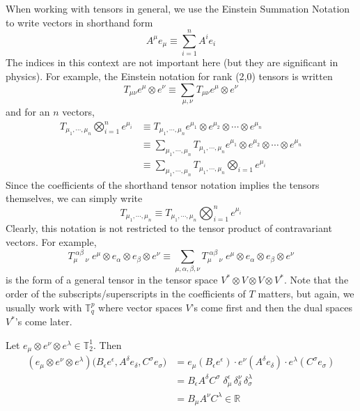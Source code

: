   When working with tensors in general, we use the Einstein Summation Notation to write vectors in shorthand form
  \[ A^{\mu} e_{\mu} \equiv \sum_{i=1}^{n} A^{i} e_{i}\]
  The indices in this context are not important here (but they are significant in physics). For example, the Einstein notation for rank (2,0) tensors is written
  \[ T_{\mu \nu} e^{\mu} \otimes e^{\nu} \equiv \sum_{\mu, \nu} T_{\mu \nu} e^{\mu} \otimes e^{\nu}\]
  and for an $n$ vectors, 
  \begin{align*}
    T_{\mu_{1}, \cdots, \mu_{n}} \bigotimes_{i=1}^{n} e^{\mu_{i}} & \equiv T_{\mu_{1}, \cdots, \mu_{n}} e^{\mu_{1}} \otimes e^{\mu_{2}} \otimes \cdots \otimes e^{\mu_{n}} \\
       & \equiv \sum_{\mu_{1}, \cdots, \mu_{n}} T_{\mu_{1}, \cdots, \mu_{n}} e^{\mu_{1}} \otimes e^{\mu_{2}} \otimes \cdots \otimes e^{\mu_{n}} \\
       & \equiv \sum_{\mu_{1}, \cdots, \mu_{n}} T_{\mu_{1}, \cdots, \mu_{n}} \bigotimes_{i=1} e^{\mu_{i}}
  \end{align*}
  Since the coefficients of the shorthand tensor notation implies the tensors themselves, we can simply write
  \[ T_{\mu_{1}, \cdots, \mu_{n}} \equiv T_{\mu_{1}, \cdots, \mu_{n}} \bigotimes_{i=1}^{n} e^{\mu_{i}} \]
  Clearly, this notation is not restricted to the tensor product of contravariant vectors. For example,
  \[T_{\mu \;\;\;\;\nu}^{\; \alpha \beta} \; e^{\mu} \otimes e_{\alpha} \otimes e_{\beta} \otimes e^{\nu}  \equiv \sum_{\mu, \alpha, \beta, \nu} T_{\mu \;\;\;\; \nu}^{\; \alpha \beta} \; e^{\mu} \otimes e_{\alpha} \otimes e_{\beta} \otimes e^{\nu}\]
  is the form of a general tensor in the tensor space $V^* \otimes V \otimes V \otimes V^*$. Note that the order of the subscripts/superscripts in the coefficients of $T$ matters, but again, we usually work with $\mathbb{T}^p_q$ where vector spaces $V$'s come first and then the dual spaces $V^*$'s come later. 

  \begin{example}
    Let $e_{\mu} \otimes e^{\nu} \otimes e^{\lambda} \in \mathbb{T}^{1}_{2}$. Then 
    \begin{align*}
    (e_{\mu} \otimes e^{\nu} \otimes e^{\lambda}) \big( B_{\epsilon} e ^{\epsilon}, A^{\delta} e_{\delta}, C^{\sigma} e_{\sigma} \big) & = e_{\mu} (B_{\epsilon} e^{\epsilon}) \cdot e^{\nu} (A^{\delta} e_{\delta}) \cdot e^{\lambda} (C^\sigma e_{\sigma}) \\
     & = B_{\epsilon} A^{\delta} C^{\sigma} \; \delta_{\mu}^{\epsilon} \, \delta_{\delta}^{\nu} \, \delta_{\sigma}^{\lambda} \\
     & = B_{\mu} A^{\nu} C^{\lambda} \in \mathbb{R} 
     \end{align*}
  \end{example}

